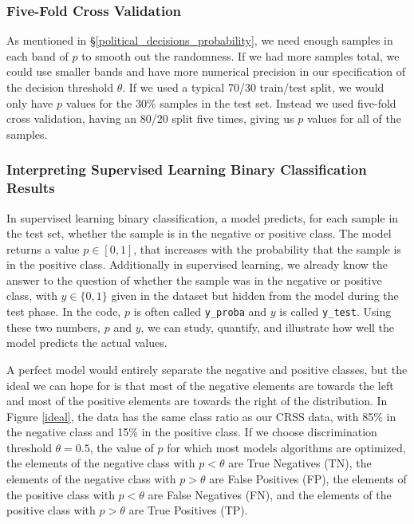 \FloatBarrier


\subsubsection{Five-Fold Cross Validation}
\label{cross_validation}

As mentioned in \S\ref{political_decisions_probability}, 
we need enough samples in each band of $p$ to smooth out the randomness.  If we had more samples total, we could use smaller bands and have more numerical precision in our specification of the decision threshold $\theta$.  If we used a typical 70/30 train/test split, we would only have $p$ values for the 30\% samples in the test set.  Instead we used five-fold cross validation, having an 80/20 split five times, giving us $p$ values for all of the samples.  

\FloatBarrier
\subsubsection{Interpreting Supervised Learning Binary Classification Results}
\label{interpreting_ideal}

In supervised learning binary classification, a model predicts, for each sample in the test set, whether the sample is in the negative or positive class.  The model returns a value $p \in [0,1]$, that increases with the probability that the sample is in the positive class.  Additionally in supervised learning, we already know the answer to the question of whether the sample was in the negative or positive class, with $y \in \{0,1\}$ given in the dataset but hidden from the model during the test phase.  In the code, $p$ is often called \verb|y_proba| and $y$ is called \verb|y_test|.  Using these two numbers, $p$ and $y$, we can study, quantify, and illustrate how well the model predicts the actual values.  

A perfect model would entirely separate the negative and positive classes, but the ideal we can hope for is that most of the negative elements are towards the left and most of the positive elements are towards the right of the distribution.  In Figure \ref{ideal}, the data has the same class ratio as our CRSS data, with 85\% in the negative class and 15\% in the positive class.  If we choose discrimination threshold $\theta = 0.5$, the value of $p$ for which most models algorithms are optimized, the elements of the negative class with $p<\theta$ are True Negatives (TN), the elements of the negative class with $p > \theta$ are False Positives (FP), the elements of the positive class with $p < \theta$ are False Negatives (FN), and the elements of the positive class with $p > \theta$ are True Positives (TP).  

